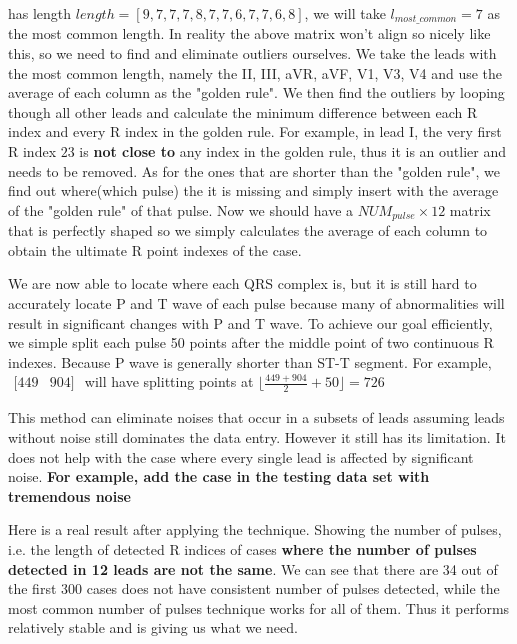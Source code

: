 \documentclass[runningheads]{llncs}
\begin{document}
has length $length = [9, 7, 7, 7, 8, 7, 7, 6, 7, 7, 6, 8]$, we will take $l_{most\_common} = 7$ as the most common length. In reality the above matrix won't align so nicely like this, so we need to find and eliminate outliers ourselves. We take the leads with the most common length, namely the II, III, aVR, aVF, V1, V3, V4 and use the average of each column as the "golden rule". We then find the outliers by looping though all other leads and calculate the minimum difference between each R index and every R index in the golden rule. For example, in lead I, the very first R index $23$ is \textbf{not close to} any index in the golden rule, thus it is an outlier and needs to be removed. As for the ones that are shorter than the "golden rule", we find out where(which pulse) the it is missing and simply insert with the average of the "golden rule" of that pulse. Now we should have a $NUM_{pulse} \times 12$ matrix that is perfectly shaped so we simply calculates the average of each column to obtain the ultimate R point indexes of the case.

We are now able to locate where each QRS complex is, but it is still hard to accurately locate P and T wave of each pulse because many of abnormalities will result in significant changes with P and T wave. To achieve our goal efficiently, we simple split each pulse 50 points after the middle point of two continuous R indexes. Because P wave is generally shorter than ST-T segment. For example, $\begin{matrix}
[449&904]
\end{matrix}$ will have splitting points at $\lfloor \frac{449 + 904}{2} + 50\rfloor = 726$ 

This method can eliminate noises that occur in a subsets of leads assuming leads without noise still dominates the data entry. However it still has its limitation. It does not help with the case where every single lead is affected by significant noise. \textbf{For example, add the case in the testing data set with tremendous noise}

Here is a real result after applying the technique. Showing the number of pulses, i.e. the length of detected R indices of cases \textbf{where the number of pulses detected in 12 leads are not the same}. We can see that there are 34 out of the first 300 cases does not have consistent number of pulses detected, while the most common number of pulses technique works for all of them. Thus it performs relatively stable and is giving us what we need.
\end{document}
